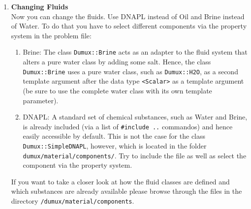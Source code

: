 \begin{enumerate}
\item \textbf{Changing Fluids} \\
Now you can change the fluids. Use DNAPL instead of Oil and Brine instead of Water. To do that you have to select different components via the property system in the problem file:
\begin{enumerate}
 \item Brine: The class \texttt{Dumux::Brine} acts as an adapter to the fluid system that alters a pure water class by adding some salt. Hence, the class \texttt{Dumux::Brine} uses a pure water class, such as \texttt{Dumux::H2O}, as a second template argument after the data type \texttt{<Scalar>} as a template argument (be sure to use the complete water class with its own template parameter).
 \item DNAPL: A standard set of chemical substances, such as Water and Brine, is already included (via a list of \texttt{\#include ..} commandos) and hence easily accessible by default. This is not the case for the class \texttt{Dumux::SimpleDNAPL}, however, which is located in the folder \texttt{dumux/material/components/}. Try to include the file as well as select the component via the property system.
\end{enumerate}
If you want to take a closer look at how the fluid classes are defined and which substances are already available please browse through the files in the directory
\texttt{/dumux/material/components}.


\end{enumerate}

